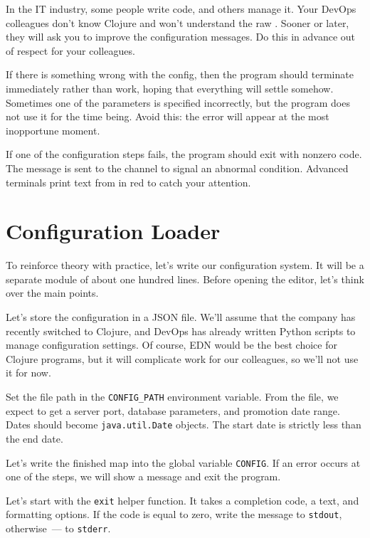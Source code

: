 
In the IT industry, some people write code, and others manage it. Your DevOps colleagues don't know Clojure and won't understand the raw . Sooner or later, they will ask you to improve the configuration messages. Do this in advance out of respect for your colleagues.

If there is something wrong with the config, then the program should terminate immediately rather than work, hoping that everything will settle somehow. Sometimes one of the parameters is specified incorrectly, but the program does not use it for the time being. Avoid this: the error will appear at the most inopportune moment.


If one of the configuration steps fails, the program should exit with nonzero code. The message is sent to the  channel to signal an abnormal condition. Advanced terminals print text from  in red to catch your attention.

\section{Configuration Loader}


To reinforce theory with practice, let's write our configuration system. It will be a separate module of about one hundred lines. Before opening the editor, let's think over the main points.

Let's store the configuration in a JSON file. We'll assume that the company has recently switched to Clojure, and DevOps has already written Python scripts to manage configuration settings. Of course, EDN would be the best choice for Clojure programs, but it will complicate work for our colleagues, so we'll not use it for now.


Set the file path in the \verb|CONFIG_PATH| environment variable. From the file, we expect to get a server port, database parameters, and promotion date range. Dates should become \verb|java.util.Date| objects. The start date is strictly less than the end date.

Let's write the finished map into the global variable \verb|CONFIG|. If an error occurs at one of the steps, we will show a message and exit the program.

Let's start with the \verb|exit| helper function. It takes a completion code, a text, and formatting options. If the code is equal to zero, write the message to \verb|stdout|, otherwise~--- to \verb|stderr|.

